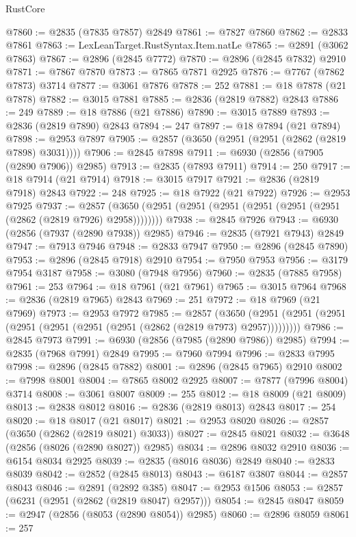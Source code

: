 \begin{lexlean}{RustCore}
\begin{coremodule}
@7860 := @2835 (@7835 @7857) @2849
@7861 := @7827 @7860
@7862 := @2833 @7861
@7863 := LexLeanTarget.RustSyntax.Item.natLe
@7865 := @2891 (@3062 @7863)
@7867 := @2896 (@2845 @7772)
@7870 := @2896 (@2845 @7832) @2910
@7871 := @7867 @7870
@7873 := @7865 @7871 @2925
@7876 := @7767 (@7862 @7873) @3714
@7877 := @3061 @7876
@7878 := 252
@7881 := @18 @7878 (@21 @7878)
@7882 := @3015 @7881
@7885 := @2836 (@2819 @7882) @2843
@7886 := 249
@7889 := @18 @7886 (@21 @7886)
@7890 := @3015 @7889
@7893 := @2836 (@2819 @7890) @2843
@7894 := 247
@7897 := @18 @7894 (@21 @7894)
@7898 := @2953 @7897
@7905 := @2857 (@3650 (@2951 (@2951 (@2862 (@2819 @7898) @3031))))
@7906 := @2845 @7898
@7911 := @6930 (@2856 (@7905 (@2890 @7906)) @2985)
@7913 := @2835 (@7893 @7911)
@7914 := 250
@7917 := @18 @7914 (@21 @7914)
@7918 := @3015 @7917
@7921 := @2836 (@2819 @7918) @2843
@7922 := 248
@7925 := @18 @7922 (@21 @7922)
@7926 := @2953 @7925
@7937 := @2857 (@3650 (@2951 (@2951 (@2951 (@2951 (@2951 (@2951 (@2862 (@2819 @7926) @2958))))))))
@7938 := @2845 @7926
@7943 := @6930 (@2856 (@7937 (@2890 @7938)) @2985)
@7946 := @2835 (@7921 @7943) @2849
@7947 := @7913 @7946
@7948 := @2833 @7947
@7950 := @2896 (@2845 @7890)
@7953 := @2896 (@2845 @7918) @2910
@7954 := @7950 @7953
@7956 := @3179 @7954 @3187
@7958 := @3080 (@7948 @7956)
@7960 := @2835 (@7885 @7958)
@7961 := 253
@7964 := @18 @7961 (@21 @7961)
@7965 := @3015 @7964
@7968 := @2836 (@2819 @7965) @2843
@7969 := 251
@7972 := @18 @7969 (@21 @7969)
@7973 := @2953 @7972
@7985 := @2857
    (@3650 (@2951 (@2951 (@2951 (@2951 (@2951 (@2951 (@2951 (@2862 (@2819 @7973) @2957)))))))))
@7986 := @2845 @7973
@7991 := @6930 (@2856 (@7985 (@2890 @7986)) @2985)
@7994 := @2835 (@7968 @7991) @2849
@7995 := @7960 @7994
@7996 := @2833 @7995
@7998 := @2896 (@2845 @7882)
@8001 := @2896 (@2845 @7965) @2910
@8002 := @7998 @8001
@8004 := @7865 @8002 @2925
@8007 := @7877 (@7996 @8004) @3714
@8008 := @3061 @8007
@8009 := 255
@8012 := @18 @8009 (@21 @8009)
@8013 := @2838 @8012
@8016 := @2836 (@2819 @8013) @2843
@8017 := 254
@8020 := @18 @8017 (@21 @8017)
@8021 := @2953 @8020
@8026 := @2857 (@3650 (@2862 (@2819 @8021) @3033))
@8027 := @2845 @8021
@8032 := @3648 (@2856 (@8026 (@2890 @8027)) @2985)
@8034 := @2896 @8032 @2910
@8036 := @6154 @8034 @2925
@8039 := @2835 (@8016 @8036) @2849
@8040 := @2833 @8039
@8042 := @2852 (@2845 @8013)
@8043 := @6187 @3807
@8044 := @2857 @8043
@8046 := @2891 (@2892 @385)
@8047 := @2953 @1506
@8053 := @2857 (@6231 (@2951 (@2862 (@2819 @8047) @2957)))
@8054 := @2845 @8047
@8059 := @2947 (@2856 (@8053 (@2890 @8054)) @2985)
@8060 := @2896 @8059
@8061 := 257

\end{coremodule}
\end{lexlean}
